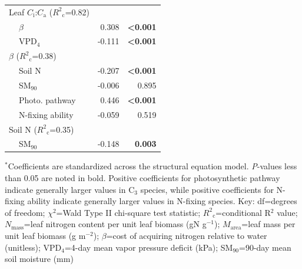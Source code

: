\begin{table}
\begin{tabular}{p{0.5cm}p{3cm}p{1.5cm}p{1.5cm}}
            \multicolumn{2}{l}{Leaf $C_\mathrm{i}$:$C_\mathrm{a}$ ($R^2{}_\mathrm{c}$=0.82)} && \\
            & \multicolumn{1}{l}{$\beta$} & \multicolumn{1}{r}{0.308} & \multicolumn{1}{r}{\textbf{<0.001}} \\
            & \multicolumn{1}{l}{VPD$_4$} & \multicolumn{1}{r}{-0.111} & \multicolumn{1}{r}{\textbf{<0.001}} \\
            \hline

            \multicolumn{2}{l}{$\beta$ ($R^2{}_\mathrm{c}$=0.38)} && \\
            & \multicolumn{1}{l}{Soil N} & \multicolumn{1}{r}{-0.207} & \multicolumn{1}{r}{\textbf{<0.001}} \\
            & \multicolumn{1}{l}{SM$_{90}$} & \multicolumn{1}{r}{-0.006} & \multicolumn{1}{r}{0.895} \\
            & \multicolumn{1}{l}{Photo. pathway} & \multicolumn{1}{r}{0.446} & \multicolumn{1}{r}{\textbf{<0.001}} \\
            & \multicolumn{1}{l}{N-fixing ability} & \multicolumn{1}{r}{-0.059} & \multicolumn{1}{r}{0.519} \\
            \hline

            \multicolumn{2}{l}{Soil N ($R^2{}_\mathrm{c}$=0.35)} && \\
            & \multicolumn{1}{l}{SM$_{90}$} & \multicolumn{1}{r}{-0.148} & \multicolumn{1}{r}{\textbf{0.003}} \\
            \hline

        \end{tabular}%
        \label{tab:table4.5}
    \end{table}
\begin{singlespace}
    \noindent $^*$Coefficients are standardized across the structural equation model. \textit{P}-values less than 0.05 are noted in bold. Positive coefficients for photosynthetic pathway indicate generally larger values in C$_3$ species, while positive coefficients for N-fixing ability indicate generally larger values in N-fixing species. Key: df=degrees of freedom; $\chi^2$=Wald Type II chi-square test statistic; $R^2{}_\mathrm{c}$=conditional R$^2$ value; $N_\mathrm{mass}$=leaf nitrogen content per unit leaf biomass (gN g$^{-1}$); $M_\mathrm{area}$=leaf mass per unit leaf biomass (g m$^{-2}$); $\beta$=cost of acquiring nitrogen relative to water (unitless); VPD$_4$=4-day mean vapor pressure deficit (kPa); SM$_{90}$=90-day mean soil moisture (mm)
\end{singlespace}
\clearpage

